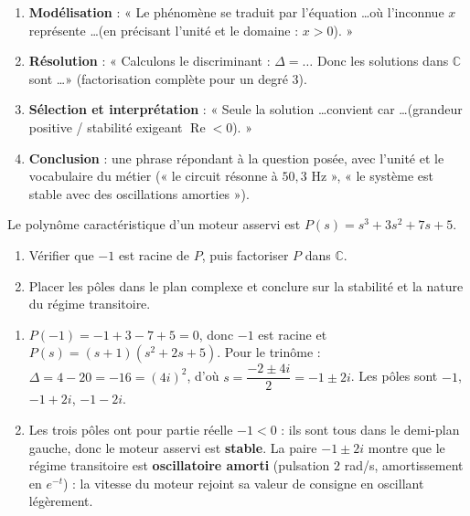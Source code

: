 \documentclass[11pt]{article}
\begin{document}
\begin{methode}
\begin{enumerate}
\item \textbf{Modélisation} : « Le phénomène se traduit par l'équation \ldots où l'inconnue $x$ représente \ldots (en précisant l'unité et le domaine : $x > 0$). »
\item \textbf{Résolution} : « Calculons le discriminant : $\Delta = \ldots$ Donc les solutions dans $\mathbb{C}$ sont \ldots » (factorisation complète pour un degré 3).
\item \textbf{Sélection et interprétation} : « Seule la solution \ldots convient car \ldots (grandeur positive / stabilité exigeant $\operatorname{Re} < 0$). »
\item \textbf{Conclusion} : une phrase répondant à la question posée, avec l'unité et le vocabulaire du métier (« le circuit résonne à $50{,}3$ Hz », « le système est stable avec des oscillations amorties »).
\end{enumerate}
\end{methode}

\begin{exercice}
Le polynôme caractéristique d'un moteur asservi est $P(s) = s^3 + 3s^2 + 7s + 5$.
\begin{enumerate}
\item Vérifier que $-1$ est racine de $P$, puis factoriser $P$ dans $\mathbb{C}$.
\item Placer les pôles dans le plan complexe et conclure sur la stabilité et la nature du régime transitoire.
\end{enumerate}
\end{exercice}

\begin{corrige}
\begin{enumerate}
\item $P(-1) = -1 + 3 - 7 + 5 = 0$, donc $-1$ est racine et $P(s) = (s+1)(s^2 + 2s + 5)$. Pour le trinôme : $\Delta = 4 - 20 = -16 = (4i)^2$, d'où $s = \dfrac{-2 \pm 4i}{2} = -1 \pm 2i$. Les pôles sont $-1$, $-1 + 2i$, $-1 - 2i$.
\item Les trois pôles ont pour partie réelle $-1 < 0$ : ils sont tous dans le demi-plan gauche, donc le moteur asservi est \textbf{stable}. La paire $-1 \pm 2i$ montre que le régime transitoire est \textbf{oscillatoire amorti} (pulsation $2$ rad/s, amortissement en $e^{-t}$) : la vitesse du moteur rejoint sa valeur de consigne en oscillant légèrement.
\end{enumerate}
\end{corrige}
\end{document}
